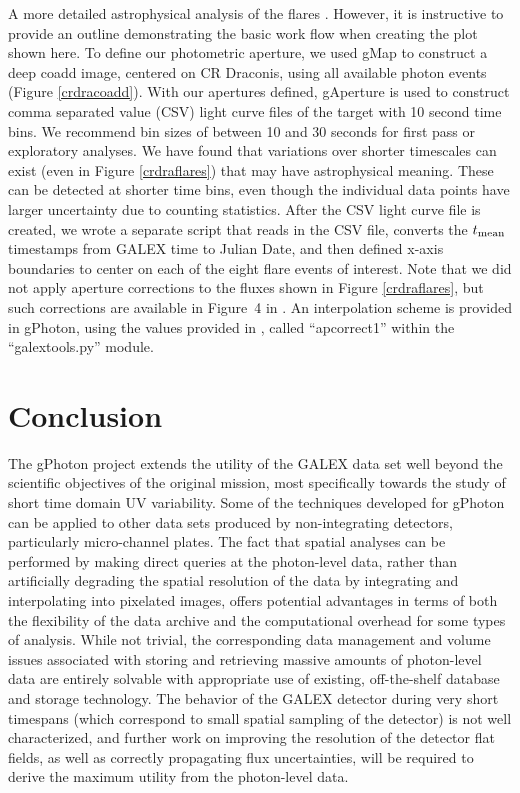 \documentclass[trackchanges,preprint2]{aastex}
\begin{document}
A more detailed astrophysical analysis of the flares . However, it is instructive to provide an outline demonstrating the basic work flow when creating the plot shown here. To define our photometric aperture, we used gMap to construct a deep coadd image, centered on CR Draconis, using all available photon events (Figure \ref{crdracoadd}). With our apertures defined, gAperture is used to construct comma separated value (CSV) light curve files of the target with 10 second time bins. We recommend bin sizes of between 10 and 30 seconds for first pass or exploratory analyses. We have found that variations over shorter timescales can exist (even in Figure \ref{crdraflares}) that may have astrophysical meaning. These can be detected at shorter time bins, even though the individual data points have larger uncertainty due to counting statistics. After the CSV light curve file is created, we wrote a separate script that reads in the CSV file, converts the $t_{\rm{mean}}$ timestamps from GALEX time to Julian Date, and then defined x-axis boundaries to center on each of the eight flare events of interest. Note that we did not apply aperture corrections to the fluxes shown in Figure \ref{crdraflares}, but such corrections are available in Figure\ 4 in \citet{mor2007}. An interpolation scheme is provided in gPhoton, using the values provided in \citet{mor2007}, called ``apcorrect1'' within the ``galextools.py'' module.

\section{Conclusion}
The gPhoton project extends the utility of the GALEX data set well beyond the scientific objectives of the original mission, most specifically towards the study of short time domain UV variability. Some of the techniques developed for gPhoton can be applied to other data sets produced by non-integrating detectors, particularly micro-channel plates. The fact that spatial analyses can be performed by making direct queries at the photon-level data, rather than artificially degrading the spatial resolution of the data by integrating and interpolating into pixelated images, offers potential advantages in terms of both the flexibility of the data archive and the computational overhead for some types of analysis. While not trivial, the corresponding data management and volume issues associated with storing and retrieving massive amounts of photon-level data are entirely solvable with appropriate use of existing, off-the-shelf database and storage technology. The behavior of the GALEX detector during very short timespans (which correspond to small spatial sampling of the detector) is not well characterized, and further work on improving the resolution of the detector flat fields, as well as correctly propagating flux uncertainties, will be required to derive the maximum utility from the photon-level data.
\end{document}
